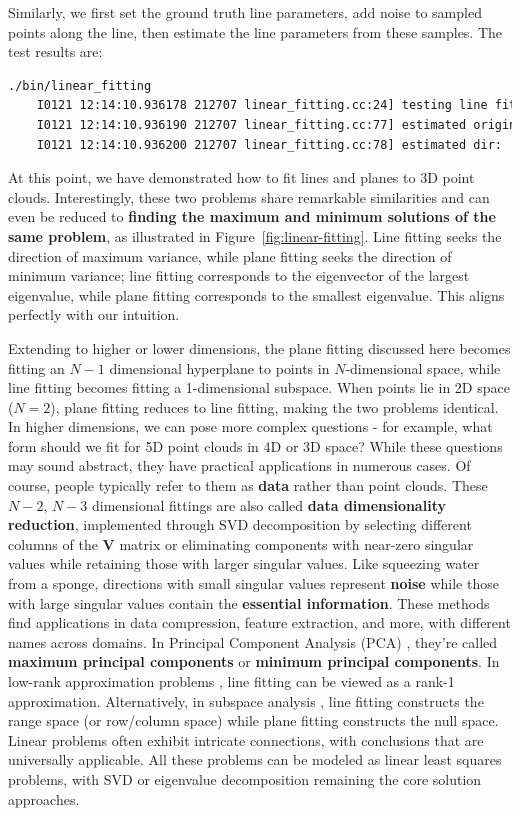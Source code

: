 Similarly, we first set the ground truth line parameters, add noise to sampled points along the line, then estimate the line parameters from these samples. The test results are:

\begin{lstlisting}[language=sh,caption=Terminal output:]
	./bin/linear_fitting
	I0121 12:14:10.936178 212707 linear_fitting.cc:24] testing line fitting
	I0121 12:14:10.936190 212707 linear_fitting.cc:77] estimated origin: 0.102906 0.204955 0.305633, true: 0.1 0.2 0.3
	I0121 12:14:10.936200 212707 linear_fitting.cc:78] estimated dir:  0.45294 0.569855 0.685646, true: 0.455842 0.569803 0.683763
\end{lstlisting}

At this point, we have demonstrated how to fit lines and planes to 3D point clouds. Interestingly, these two problems share remarkable similarities and can even be reduced to \textbf{finding the maximum and minimum solutions of the same problem}, as illustrated in Figure~\ref{fig:linear-fitting}. Line fitting seeks the direction of maximum variance, while plane fitting seeks the direction of minimum variance; line fitting corresponds to the eigenvector of the largest eigenvalue, while plane fitting corresponds to the smallest eigenvalue. This aligns perfectly with our intuition.

Extending to higher or lower dimensions, the plane fitting discussed here becomes fitting an $N-1$ dimensional hyperplane to points in $N$-dimensional space, while line fitting becomes fitting a 1-dimensional subspace. When points lie in 2D space ($N=2$), plane fitting reduces to line fitting, making the two problems identical. In higher dimensions, we can pose more complex questions - for example, what form should we fit for 5D point clouds in 4D or 3D space? While these questions may sound abstract, they have practical applications in numerous cases. Of course, people typically refer to them as \textbf{data} rather than point clouds. These $N-2$, $N-3$ dimensional fittings are also called \textbf{data dimensionality reduction}, implemented through SVD decomposition by selecting different columns of the $\bm{V}$ matrix or eliminating components with near-zero singular values while retaining those with larger singular values. Like squeezing water from a sponge, directions with small singular values represent \textbf{noise} while those with large singular values contain the \textbf{essential information}. These methods find applications in data compression, feature extraction, and more, with different names across domains. In Principal Component Analysis (PCA) \cite{Wold1987}, they're called \textbf{maximum principal components} or \textbf{minimum principal components}. In low-rank approximation problems \cite{Eckart1936}, line fitting can be viewed as a rank-1 approximation. Alternatively, in subspace analysis \cite{Lay2005}, line fitting constructs the range space (or row/column space) while plane fitting constructs the null space. Linear problems often exhibit intricate connections, with conclusions that are universally applicable. All these problems can be modeled as linear least squares problems, with SVD or eigenvalue decomposition remaining the core solution approaches.

